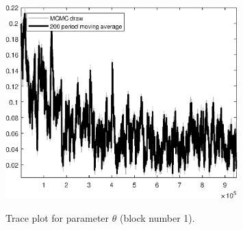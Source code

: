 \begin{figure}[H]
\centering
  \includegraphics[width=0.8\textwidth]{BRS_growth_util_sectoral/graphs/TracePlot_theta_blck_1}\\
    \caption{Trace plot for parameter ${\theta}$ (block number 1).}
\end{figure}
